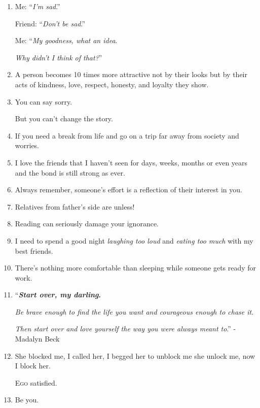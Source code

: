 \documentclass{article}
\numberwithin{equation}{section}
\begin{document}
\begin{enumerate}
    The nights spent falling in love under the stars, the mornings you woke up and watched the sunrise and all the beautiful people you met along the way.
    
    You'll think of the moment that made you truly feel alive.
    
    And at the very end, those memories will be only possessions that you own.
    \item Me: ``\textit{I'm sad}.''
    
    Friend: ``\textit{Don't be sad}.''
    
    Me: ``\textit{My goodness, what an idea}.
    
    \textit{Why didn't I think of that?}''
    \item A person becomes 10 times more attractive not by their looks but by their acts of kindness, love, respect, honesty, and loyalty they show.
    \item You can say sorry.
    
    But you can't change the story.
    \item If you need a break from life and go on a trip far away from society and worries.
    \item I love the friends that I haven't seen for days, weeks, months or even years and the bond is still strong as ever.
    \item Always remember, someone's effort is a reflection of their interest in you.
    \item Relatives from father's side are unless!
    \item Reading can seriously damage your ignorance.
    \item I need to spend a good night \textit{laughing too loud} and \textit{eating too much} with my best friends.
    \item There's nothing more comfortable than sleeping while someone gets ready for work.
    \item ``\textbf{\textit{Start over, my darling}.}
    
    \textit{Be brave enough to find the life you want and courageous enough to chase it}.
    
    \textit{Then start over and love yourself the way you were always meant to}.'' - Madalyn Beck
    \item She blocked me, I called her, I begged her to unblock me she unlock me, now I block her.
    
    \textsc{Ego} satisfied.
    \item Be you.
    

\end{enumerate}
\end{document}
